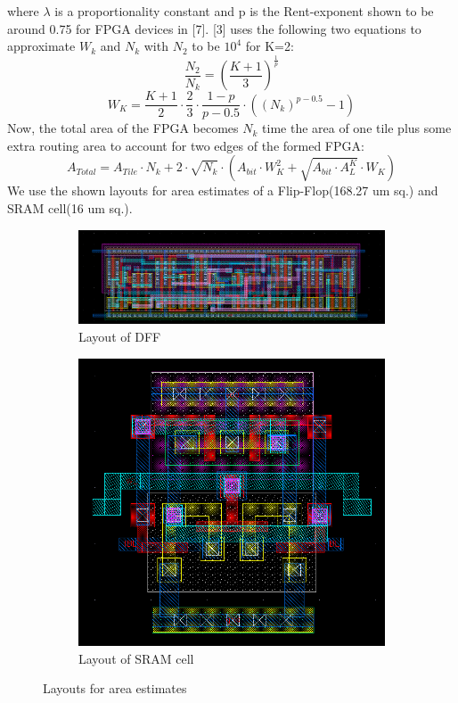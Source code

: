 where $\lambda$ is a proportionality constant and p is the Rent-exponent shown to be around 0.75 for FPGA devices in [7]. [3] uses the following two equations to approximate $W_k$ and $N_k$ with $N_2$ to be $10^4$ for K=2:
\begin{equation}
\frac{N_2}{N_k} = {(\frac{K+1}{3})}^{\frac{1}{p}}
\end{equation}
\begin{equation}
W_K = \frac{K+1}{2}\cdot\frac{2}{3}\cdot\frac{1-p}{p-0.5}\cdot({(N_k)}^{p-0.5}-1)
\end{equation}
Now, the total area of the FPGA becomes $N_k$ time the area of one tile plus some extra routing area to account for two edges of the formed FPGA:
\begin{equation}
A_{Total} = A_{Tile}\cdot{N_k} + 2\cdot\sqrt{N_k}\cdot(A_{bit}\cdot{W_K^2} + \sqrt{A_{bit}\cdot{A_L^K}}\cdot{W_K})
\end{equation}
We use the shown layouts for area estimates of a Flip-Flop(168.27 um sq.) and SRAM cell(16 um sq.).
\begin{figure}[h]
\begin{subfigure}{0.6\textwidth}
\includegraphics[width=0.9\linewidth, height = 0.35\linewidth]{DFF.png} 
\caption{Layout of DFF}
\label{fig:Figure}
\end{subfigure}
\begin{subfigure}{0.3\textwidth}
\includegraphics[width=0.9\linewidth, height = 0.8\linewidth]{SRAM.png}
\caption{Layout of SRAM cell}
\label{fig:Figure}
\end{subfigure}
\caption{Layouts for area estimates}
\label{fig:Figure}
\end{figure}
 
